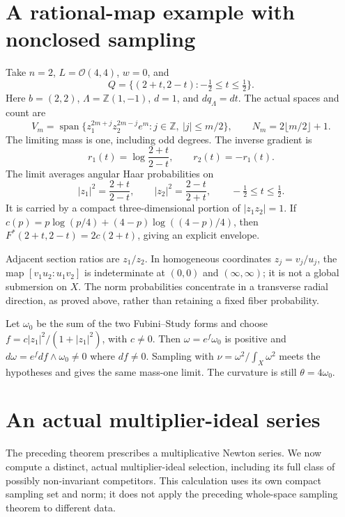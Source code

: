 \documentclass[11pt]{article}
\newcommand{\Z}{\mathbb Z}
\begin{document}
\section{A rational-map example with nonclosed sampling}
Take $n=2$, $L=\mathcal O(4,4)$, $w=0$, and
\[
 Q=\{(2+t,2-t):-\tfrac12\leq t\leq\tfrac12\}.
\]
Here $b=(2,2)$, $\Lambda=\Z(1,-1)$, $d=1$, and $dq_\Lambda=dt$.
The actual spaces and count are
\[
 V_m=\operatorname{span}\{z_1^{2m+j}z_2^{2m-j}e^m:
                          j\in\Z,\ |j|\leq m/2\},
 \qquad N_m=2\lfloor m/2\rfloor+1.
\]
The limiting mass is one, including odd degrees. The inverse gradient is
\[
 r_1(t)=\log\frac{2+t}{2-t},\qquad r_2(t)=-r_1(t).
\]
The limit averages angular Haar probabilities on
\[
 |z_1|^2=\frac{2+t}{2-t},\qquad
 |z_2|^2=\frac{2-t}{2+t},\qquad -\tfrac12\leq t\leq\tfrac12.
\]
It is carried by a compact three-dimensional portion of $|z_1z_2|=1$.
If $c(p)=p\log(p/4)+(4-p)\log((4-p)/4)$, then
$F^*(2+t,2-t)=2c(2+t)$, giving an explicit envelope.

Adjacent section ratios are $z_1/z_2$. In homogeneous coordinates
$z_j=v_j/u_j$, the map $[v_1u_2:u_1v_2]$ is indeterminate at
$(0,0)$ and $(\infty,\infty)$; it is not a global submersion on $X$.
The norm probabilities concentrate in a transverse radial direction,
as proved above, rather than retaining a fixed fiber probability.

Let $\omega_0$ be the sum of the two Fubini--Study forms and choose
$f=c|z_1|^2/(1+|z_1|^2)$, with $c\ne0$. Then
$\omega=e^f\omega_0$ is positive and
$d\omega=e^fdf\wedge\omega_0\ne0$ where $df\ne0$.
Sampling with $\nu=\omega^2/\int_X\omega^2$ meets the hypotheses and
gives the same mass-one limit. The curvature is still $\theta=4\omega_0$.

\section{An actual multiplier-ideal series}
The preceding theorem prescribes a multiplicative Newton series. We now
compute a distinct, actual multiplier-ideal selection, including its full
class of possibly non-invariant competitors. This calculation uses its own
compact sampling set and norm; it does not apply the preceding whole-space
sampling theorem to different data.
\end{document}
